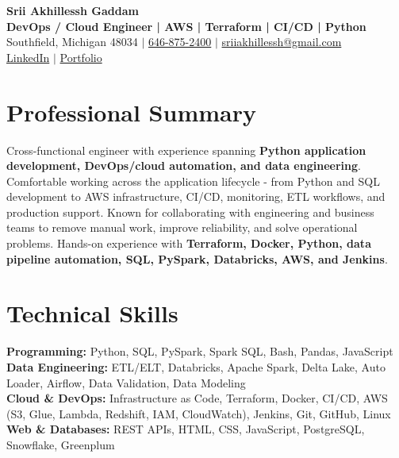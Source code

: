 \documentclass[letterpaper,10pt]{article}
\begin{document}
\fontsize{9.35pt}{10.45pt}\selectfont

\begin{center}
    {\LARGE \textbf{Srii Akhillessh Gaddam}} \\[-1pt]
    \textbf{DevOps / Cloud Engineer | AWS | Terraform | CI/CD | Python} \\[2pt]
    Southfield, Michigan 48034 $|$
    \href{tel:6468752400}{646-875-2400} $|$
    \href{mailto:sriiakhillessh@gmail.com}{sriiakhillessh@gmail.com} \\[1pt]
    \href{https://www.linkedin.com/in/srii-akhiilessh-gaddam-b48668191/}{LinkedIn} $|$
    \href{https://sriiakhillesshg.github.io/portfolio/}{Portfolio}
\end{center}
\vspace{-8pt}

\section{Professional Summary}
\small{Cross-functional engineer with experience spanning \textbf{Python application development, DevOps/cloud automation, and data engineering}. Comfortable working across the application lifecycle - from Python and SQL development to AWS infrastructure, CI/CD, monitoring, ETL workflows, and production support. Known for collaborating with engineering and business teams to remove manual work, improve reliability, and solve operational problems. Hands-on experience with \textbf{Terraform, Docker, Python, data pipeline automation, SQL, PySpark, Databricks, AWS, and Jenkins}.}

\section{Technical Skills}
\small{
\textbf{Programming:} Python, SQL, PySpark, Spark SQL, Bash, Pandas, JavaScript \\
\textbf{Data Engineering:} ETL/ELT, Databricks, Apache Spark, Delta Lake, Auto Loader, Airflow, Data Validation, Data Modeling \\
\textbf{Cloud \& DevOps:} Infrastructure as Code, Terraform, Docker, CI/CD, AWS (S3, Glue, Lambda, Redshift, IAM, CloudWatch), Jenkins, Git, GitHub, Linux \\
\textbf{Web \& Databases:} REST APIs, HTML, CSS, JavaScript, PostgreSQL, Snowflake, Greenplum
}
\end{document}
